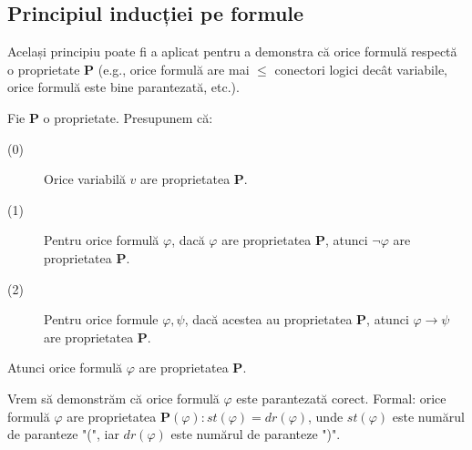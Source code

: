 \subsection{Principiul inducției pe formule}

Același principiu poate fi a aplicat pentru a demonstra că orice formulă respectă o proprietate \textbf{P} (e.g., orice formulă are mai \( \leq \) conectori logici
decât variabile, orice formulă este bine parantezată, etc.).

\begin{prop}

	Fie \textbf{P} o proprietate. Presupunem că:

	\begin{description}
		\item[(0)] Orice variabilă \( v \) are proprietatea \textbf{P}.
		\item[(1)] Pentru orice formulă \( \varphi \), dacă \( \varphi \) are proprietatea \textbf{P}, atunci \( \neg \varphi \) are proprietatea \textbf{P}.
		\item[(2)] Pentru orice formule \( \varphi, \psi \), dacă acestea au proprietatea \textbf{P}, atunci \( \varphi \to \psi \) are proprietatea \textbf{P}.
	\end{description}

	\noindent	Atunci orice formulă \( \varphi \) are proprietatea \textbf{P}.

\end{prop}

\begin{eg}

	Vrem să demonstrăm că orice formulă \( \varphi \) este parantezată corect. Formal: orice formulă \( \varphi \) are proprietatea \( \mathbf{P}(\varphi) : st(\varphi) = dr(\varphi) \),
	unde \( st(\varphi) \) este numărul de paranteze "(", iar \( dr(\varphi) \) este numărul de paranteze ")".

\end{eg}

